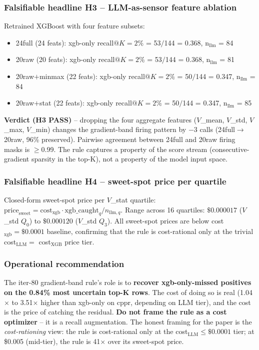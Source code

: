 \subsubsection{Falsifiable headline H3 -- LLM-as-sensor feature ablation}
Retrained XGBoost with four feature subsets:
\begin{itemize}
\item 24full (24 feats): xgb-only recall$@K{=}2\%$ = 53$/$144 = 0.368, n$_{\text{llm}}$ = 84
\item 20raw (20 feats): xgb-only recall$@K{=}2\%$ = 53$/$144 = 0.368, n$_{\text{llm}}$ = 81
\item 20raw$+$minmax (22 feats): xgb-only recall$@K{=}2\%$ = 50$/$144 = 0.347, n$_{\text{llm}}$ = 84
\item 20raw$+$stat (22 feats): xgb-only recall$@K{=}2\%$ = 50$/$144 = 0.347, n$_{\text{llm}}$ = 85
\end{itemize}
\textbf{Verdict (H3 PASS)} -- dropping the four aggregate features
($V$\_mean, $V$\_std, $V$\_max, $V$\_min) changes the gradient-band firing
pattern by $-3$ calls (24full$\to$20raw, 96\% preserved). Pairwise
agreement between 24full and 20raw firing masks is $\geq$0.99.
The rule captures a property of the score stream
(consecutive-gradient sparsity in the top-K), not a property of the
model input space.

\subsubsection{Falsifiable headline H4 -- sweet-spot price per quartile}
Closed-form sweet-spot price per $V$\_stat quartile:
$\text{price}_{\text{sweet}} = \text{cost}_{\text{xgb}} \cdot
\text{xgb\_caught}_{q} / n_{\text{llm},q}$.  Range across 16 quartiles:
$\$0.000017$ ($V$\_std $Q_0$) to $\$0.000120$ ($V$\_std $Q_3$).
All sweet-spot prices are below cost$_{\text{xgb}} = \$0.0001$ baseline,
confirming that the rule is cost-rational only at the trivial
cost$_{\text{LLM}} =$ cost$_{\text{XGB}}$ price tier.

\subsubsection{Operational recommendation}
The iter-80 gradient-band rule's role is to \textbf{recover xgb-only-missed
positives on the 0.84\% most uncertain top-K rows}.  The cost of doing so
is real (1.04$\times$ to 3.51$\times$ higher than xgb-only on cppr,
depending on LLM tier), and the cost is the price of catching the residual.
\textbf{Do not frame the rule as a cost optimizer} -- it is a recall
augmentation.  The honest framing for the paper is the
\emph{cost-rationing} view: the rule is cost-rational only at the
cost$_{\text{LLM}} \leq \$0.0001$ tier; at \$0.005 (mid-tier), the rule
is 41$\times$ over its sweet-spot price.